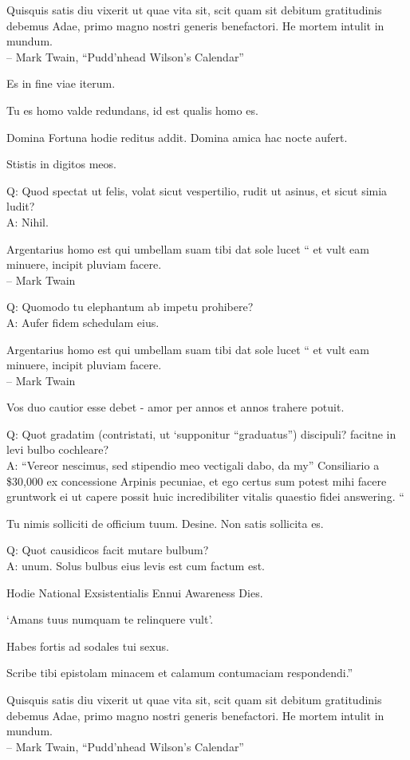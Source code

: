 \documentclass[titlepage,12pt]{memoir}
\begin{document}
Quisquis satis diu vixerit ut quae vita sit, scit quam sit debitum
gratitudinis debemus Adae, primo magno nostri generis benefactori. He
mortem intulit in mundum.
\\-- Mark Twain, “Pudd’nhead Wilson’s Calendar”

Es in fine viae iterum.

Tu es homo valde redundans, id est qualis homo es.

Domina Fortuna hodie reditus addit. Domina amica hac nocte aufert.

Stistis in digitos meos.

Q: Quod spectat ut felis, volat sicut vespertilio, rudit ut asinus, et
sicut simia ludit?\\
A: Nihil.

 Argentarius homo est qui umbellam suam tibi dat sole lucet “
et vult eam minuere, incipit pluviam facere.
\\-- Mark Twain

Q: Quomodo tu elephantum ab impetu prohibere?\\
A: Aufer fidem schedulam eius.

 Argentarius homo est qui umbellam suam tibi dat sole lucet “
et vult eam minuere, incipit pluviam facere.
\\-- Mark Twain

Vos duo cautior esse debet - amor per annos et annos trahere potuit.

Q: Quot gradatim (contristati, ut ‘supponitur “graduatus”) discipuli?
facitne in levi bulbo cochleare?\\
A: “Vereor nescimus, sed stipendio meo vectigali dabo, da my”
Consiliario a \$30,000 ex concessione Arpinis pecuniae, et ego certus sum
potest mihi facere gruntwork ei ut capere possit
huic incredibiliter vitalis quaestio fidei answering. “

Tu nimis solliciti de officium tuum. Desine. Non satis sollicita es.

Q: Quot causidicos facit mutare bulbum?\\
A: unum. Solus bulbus eius levis est cum factum est.

Hodie National Exsistentialis Ennui Awareness Dies.

‘Amans tuus numquam te relinquere vult’.

Habes fortis ad sodales tui sexus.

Scribe tibi epistolam minacem et calamum contumaciam respondendi.”

Quisquis satis diu vixerit ut quae vita sit, scit quam sit debitum
gratitudinis debemus Adae, primo magno nostri generis benefactori. He
mortem intulit in mundum.
\\-- Mark Twain, “Pudd’nhead Wilson’s Calendar”
\end{document}

